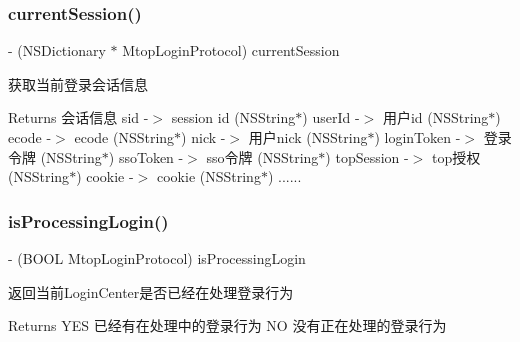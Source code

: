 \subsubsection{\texorpdfstring{current\+Session()}{currentSession()}}
{\footnotesize\ttfamily -\/ (N\+S\+Dictionary $\ast$ Mtop\+Login\+Protocol) current\+Session \begin{DoxyParamCaption}{ }\end{DoxyParamCaption}\hspace{0.3cm}{\ttfamily [required]}}

获取当前登录会话信息 \begin{DoxyReturn}{Returns}
会话信息 sid -\/$>$ session id (N\+S\+String$\ast$) user\+Id -\/$>$ 用户id (N\+S\+String$\ast$) ecode -\/$>$ ecode (N\+S\+String$\ast$) nick -\/$>$ 用户nick (N\+S\+String$\ast$) login\+Token -\/$>$ 登录令牌 (N\+S\+String$\ast$) sso\+Token -\/$>$ sso令牌 (N\+S\+String$\ast$) top\+Session -\/$>$ top授权 (N\+S\+String$\ast$) cookie -\/$>$ cookie (N\+S\+String$\ast$) ...... 
\end{DoxyReturn}
\mbox{\label{protocol_mtop_login_protocol_01-p_afc9803feb43aa60bd2e1fb8fec043e1a}} 
\subsubsection{\texorpdfstring{is\+Processing\+Login()}{isProcessingLogin()}}
{\footnotesize\ttfamily -\/ (B\+O\+OL Mtop\+Login\+Protocol) is\+Processing\+Login \begin{DoxyParamCaption}{ }\end{DoxyParamCaption}\hspace{0.3cm}{\ttfamily [required]}}

返回当前\+Login\+Center是否已经在处理登录行为 \begin{DoxyReturn}{Returns}
Y\+ES 已经有在处理中的登录行为 NO 没有正在处理的登录行为 
\end{DoxyReturn}
\mbox{\label{protocol_mtop_login_protocol_01-p_a96dd71df504db90522a1045402cd8b61}} 
